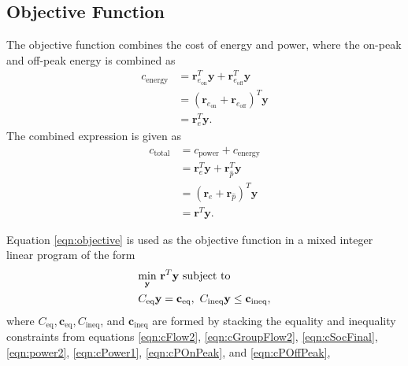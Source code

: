 \subsection{Objective Function}
The objective function combines the cost of energy and power, where the on-peak and off-peak energy is combined as 
\begin{equation}\label{eqn:cEnergy2}
	\begin{aligned}
		c_{\text{energy}} &= \mathbf{r}_{e_\text{on}}^T\mathbf{y} + \mathbf{r}_{e_\text{off}}^T\mathbf{y} \\
		&=\left ( \mathbf{r}_{e_\text{on}} + \mathbf{r}_{e_\text{off}} \right )^T \mathbf{y} \\
		&= \mathbf{r}_e^T\mathbf{y}.
	\end{aligned}
\end{equation}
The combined expression is given as 
\begin{equation}\label{eqn:objective}
	\begin{aligned}
		c_{\text{total}} &= c_{\text{power}} + c_{\text{energy}} \\ 
				 &= \mathbf{r}_e^T\mathbf{y} + \mathbf{r}_{\hat{p}}^T\mathbf{y} \\
				 &= \left ( \mathbf{r}_e + \mathbf{r}_{\hat{p}} \right )^T\mathbf{y} \\
				 &= \mathbf{r}^T\mathbf{y}.
	\end{aligned}
\end{equation}
\par Equation \ref{eqn:objective} is used as the objective function in a mixed integer linear program of the form
\begin{equation}
	\begin{aligned}
		& \underset{\mathbf{y}}{\scalebox{1}{\text{min}}} \ \mathbf{r}^T\mathbf{y} \ \text{subject to}\\
		& C_{\text{eq}}\mathbf{y} = \mathbf{c}_{\text{eq}}, \ C_{\text{ineq}}\mathbf{y} \le \mathbf{c}_{\text{ineq}},
	\end{aligned}
\end{equation}
where $C_{\text{eq}}, \mathbf{c}_{\text{eq}}, C_{\text{ineq}}$, and $\mathbf{c}_{\text{ineq}}$ are formed by stacking the equality and inequality constraints from equations \ref{eqn:cFlow2}, \ref{eqn:cGroupFlow2}, \ref{eqn:cSocFinal}, \ref{eqn:power2}, \ref{eqn:cPower1}, \ref{eqn:cPOnPeak}, and \ref{eqn:cPOffPeak},
